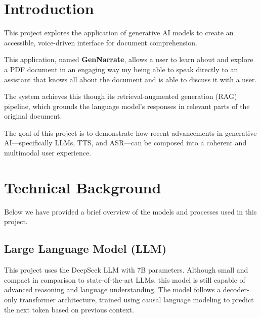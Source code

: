 \documentclass[twocolumn]{article}
\begin{document}

\section{Introduction}
This project explores the application of generative AI models to create an accessible, voice-driven interface for document comprehension.

This application, named \textbf{GenNarrate}, allows a user to learn about and explore a PDF document in an engaging way my being able to speak directly to an assistant that knows all about the document and is able to discuss it with a user.

The system achieves this though its retrieval-augmented generation (RAG) pipeline, which grounds the language model’s responses in relevant parts of the original document.

The goal of this project is to demonstrate how recent advancements in generative AI—specifically LLMs, TTS, and ASR—can be composed into a coherent and multimodal user experience.

\section{Technical Background}
Below we have provided a brief overview of the models and processes used in this project.

\subsection{Large Language Model (LLM)}
This project uses the DeepSeek LLM with 7B parameters\cite{deepseek7bchat}. Although small and compact in comparison to state-of-the-art LLMs, this model is still capable of advanced reasoning and language understanding. The model follows a decoder-only transformer architecture, trained using causal language modeling to predict the next token based on previous context.
\end{document}
